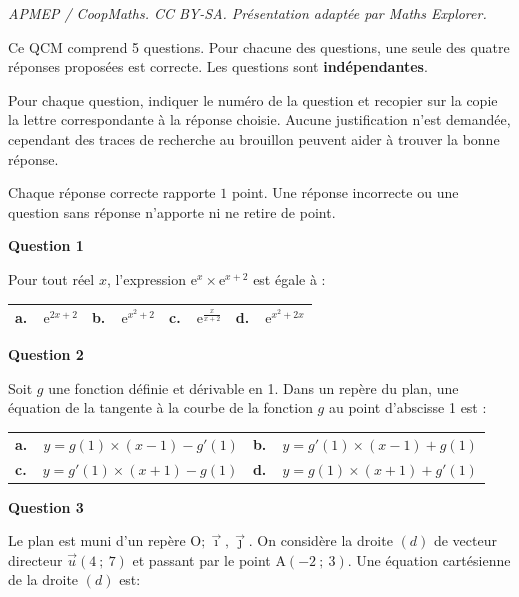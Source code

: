 \documentclass[10pt]{article}
\providecommand{\vect}[1]{\overrightarrow{#1}}
\providecommand{\Oij}{\(\mathrm{O};\vec{\imath},\vec{\jmath}\)}
\begin{document}
\noindent\textit{APMEP / CoopMaths. CC BY-SA. Présentation adaptée par Maths Explorer.}\par\medskip
\medskip

Ce QCM comprend 5 questions. Pour chacune des questions, une seule des quatre réponses proposées est correcte. Les questions sont \textbf{indépendantes}. 

Pour chaque question, indiquer le numéro de la question et recopier sur la copie la lettre correspondante à la réponse choisie. Aucune justification n'est demandée, cependant des traces de recherche au brouillon peuvent aider à trouver la bonne réponse. 

Chaque réponse correcte rapporte $1$ point. Une réponse incorrecte ou une question sans réponse n'apporte ni ne retire de point.

\medskip

\textbf{Question 1}

Pour tout réel $x$, l'expression $\text{e}^x\times \text{e}^{x+2}$ est égale à :

\begin{center}
\begin{tabularx}{\linewidth}{|*{4}{X|}}\hline
\textbf{a.~~}$\text{e}^{2x+2}$&\textbf{b.~~}$\text{e}^{x^2+2}$&\textbf{c.~~}$\text{e}^{\frac{x}{x+2}}$&\textbf{d.~~}$\text{e}^{x^2 + 2x}$\\ \hline
\end{tabularx}
\end{center}
\textbf{Question 2}

Soit $g$ une fonction définie et dérivable en 1. Dans un repère du plan, une équation de la
tangente à la courbe de la fonction $g$ au point d'abscisse 1 est : 

\begin{center}
\begin{tabularx}{\linewidth}{|*{2}{X|}}\hline
\textbf{a.~~}$y=g(1) \times (x - 1)- g'(1)$&\textbf{b.~~}$y= g'(1) \times (x - 1) +g(1)$\\
\textbf{c.~~}$y = g'(1) \times (x + 1) - g(1)$&\textbf{d.~~}$y = g(1) \times (x + 1) + g'(1)$\\ \hline
\end{tabularx}
\end{center}

\textbf{Question 3}

Le plan est muni d'un repère \Oij. On considère la droite $(d)$ de vecteur directeur $\vect{u}(4~;~7)$ et passant par le point A$(-2~;~3)$. Une équation cartésienne de la droite $(d)$ est:
\end{document}

